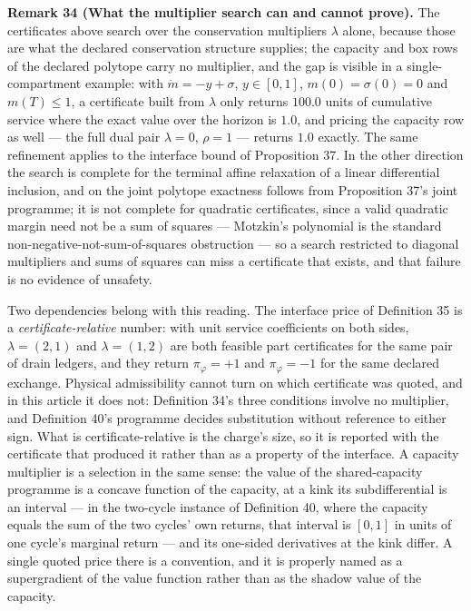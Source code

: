 \documentclass[11pt]{article}
\begin{document}
\textbf{Remark 34 (What the multiplier search can and cannot prove).} The certificates above search over the
conservation multipliers \(\lambda\) alone, because those are what the declared conservation structure
supplies; the capacity and box rows of the declared polytope carry no multiplier, and the gap is visible
in a single-compartment example: with \(\dot m = -y + \sigma\), \(y \in [0, 1]\), \(m(0) = \sigma(0) = 0\)
and \(m(T) \le 1\), a certificate built from \(\lambda\) only returns \(100.0\) units of cumulative service
where the exact value over the horizon is \(1.0\), and pricing the capacity row as well --- the full dual
pair \(\lambda = 0\), \(\rho = 1\) --- returns \(1.0\) exactly. The same refinement applies to the interface
bound of Proposition 37. In the other direction the search is complete for the terminal affine relaxation
of a linear differential inclusion, and on the joint polytope exactness follows from Proposition 37's
joint programme; it is not complete for quadratic certificates, since a valid quadratic margin need not be a sum
of squares --- Motzkin's polynomial is the standard non-negative-not-sum-of-squares obstruction --- so a
search restricted to diagonal multipliers and sums of squares can miss a certificate that exists, and that
failure is no evidence of unsafety.

Two dependencies belong with this reading. The interface price of Definition 35 is a \emph{certificate-relative}
number: with unit service coefficients on both sides, \(\lambda = (2,1)\) and \(\lambda = (1,2)\) are both
feasible part certificates for the same pair of drain ledgers, and they return \(\pi_\varphi = +1\) and
\(\pi_\varphi = -1\) for the same declared exchange. Physical admissibility cannot turn on which certificate was
quoted, and in this article it does not: Definition 34's three conditions involve no multiplier, and
Definition 40's programme decides substitution without reference to either sign. What is certificate-relative
is the charge's size, so it is reported with the certificate that produced it rather than as a property of
the interface. A capacity multiplier is a selection in the same sense: the value of the shared-capacity
programme is a concave function of the capacity, at a kink its subdifferential is an interval --- in the
two-cycle instance of Definition 40, where the capacity equals the sum of the two cycles' own returns, that
interval is \([0, 1]\) in units of one cycle's marginal return --- and its one-sided derivatives at the kink
differ. A single quoted price there is a convention, and it is properly named as a supergradient of the value
function rather than as the shadow value of the capacity.
\end{document}
